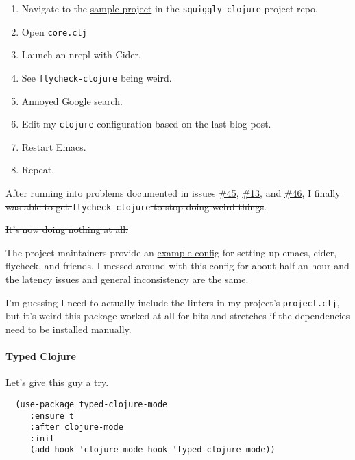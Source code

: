 \documentclass[11pt]{article}
\begin{document}
\begin{enumerate}
\item Navigate to the \href{https://github.com/clojure-emacs/squiggly-clojure/tree/master/sample-project}{sample-project} in the \texttt{squiggly-clojure} project repo.
\item Open \texttt{core.clj}
\item Launch an nrepl with Cider.
\item See \texttt{flycheck-clojure} being weird.
\item Annoyed Google search.
\item Edit my \texttt{clojure} configuration based on the last blog post.
\item Restart Emacs.
\item Repeat.
\end{enumerate}

After running into problems documented in issues \href{https://github.com/clojure-emacs/squiggly-clojure/issues/45}{\#45}, \href{https://github.com/clojure-emacs/squiggly-clojure/issues/13}{\#13}, and \href{https://github.com/clojure-emacs/squiggly-clojure/issues/46}{\#46,}
\sout{I finally was able to get \texttt{flycheck-clojure} to stop doing weird things}.

\sout{It's now doing nothing at all.}

The project maintainers provide an \href{https://github.com/clojure-emacs/example-config}{example-config} for setting up
emacs, cider, flycheck, and friends. I messed around with this config
for about half an hour and the latency issues and general
inconsistency are the same.

I'm guessing I need to actually include the linters in my project's
\texttt{project.clj}, but it's weird this package worked at all for bits and
stretches if the dependencies need to be installed manually.

\paragraph*{Typed Clojure}
\label{sec:orgd0632e5}

Let's give this \href{https://github.com/typedclojure/typed-clojure-mode}{guy} a try.

\begin{verbatim}
  (use-package typed-clojure-mode
     :ensure t
     :after clojure-mode
     :init
     (add-hook 'clojure-mode-hook 'typed-clojure-mode))
\end{verbatim}
\end{document}
